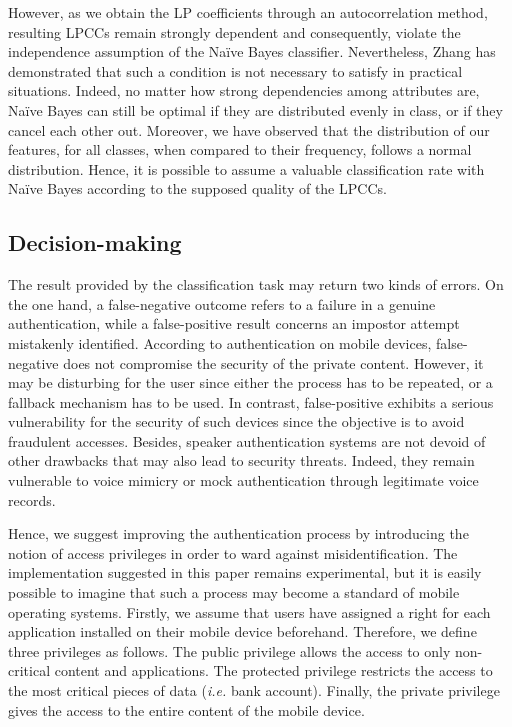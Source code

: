 \documentclass[cryptography,article,submit,moreauthors,pdftex,10pt,a4paper]{mdpi}
\begin{document}
However, as we obtain the LP coefficients through an autocorrelation method, resulting LPCCs remain strongly dependent and consequently, violate the independence assumption of the Na\"ive Bayes classifier. Nevertheless, Zhang \cite{32} has demonstrated that such a condition is not necessary to satisfy in practical situations. Indeed, no matter how strong dependencies among attributes are, Na\"ive Bayes can still be optimal if they are distributed evenly in class, or if they cancel each other out. Moreover, we have observed that the distribution of our features, for all classes, when compared to their frequency, follows a normal distribution. Hence, it is possible to assume a valuable classification rate with Na\"ive Bayes according to the supposed quality of the LPCCs.

\subsection{Decision-making}

The result provided by the classification task may return two kinds of errors. On the one hand, a false-negative outcome refers to a failure in a genuine authentication, while a false-positive result concerns an impostor attempt mistakenly identified. According to authentication on mobile devices, false-negative does not compromise the security of the private content. However, it may be disturbing for the user since either the process has to be repeated, or a fallback mechanism has to be used. In contrast, false-positive exhibits a serious vulnerability for the security of such devices since the objective is to avoid fraudulent accesses. Besides, speaker authentication systems are not devoid of other drawbacks that may also lead to security threats. Indeed, they remain vulnerable to voice mimicry or mock authentication through legitimate voice records.

Hence, we suggest improving the authentication process by introducing the notion of access privileges in order to ward against misidentification. The implementation suggested in this paper remains experimental, but it is easily possible to imagine that such a process may become a standard of mobile operating systems. Firstly, we assume that users have assigned a right for each application installed on their mobile device beforehand. Therefore, we define three privileges as follows. The public privilege allows the access to only non-critical content and applications. The protected privilege restricts the access to the most critical pieces of data (\textit{i.e.} bank account). Finally, the private privilege gives the access to the entire content of the mobile device.
\end{document}
